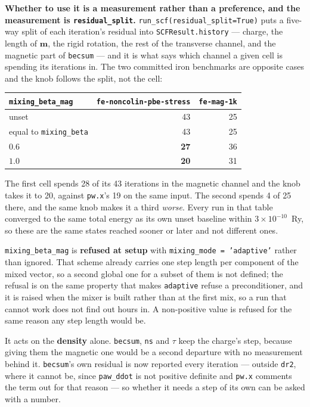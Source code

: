\documentclass[11pt,a4paper]{article}
\newcommand{\code}[1]{\texttt{\small #1}}
\begin{document}
\textbf{Whether to use it is a measurement rather than a preference, and the
measurement is \code{residual\_split}.} \code{run\_scf(residual\_split=True)}
puts a five-way split of each iteration's residual into
\code{SCFResult.history} --- charge, the length of $\mathbf m$, the rigid
rotation, the rest of the transverse channel, and the magnetic part of
\code{becsum} --- and it is what says which channel a given cell is spending its
iterations in. The two committed iron benchmarks are opposite cases and the knob
follows the split, not the cell:

\begin{center}
\begin{tabular}{lrr}
\toprule
\code{mixing\_beta\_mag} & \code{fe-noncolin-pbe-stress} & \code{fe-mag-1k} \\
\midrule
unset & 43 & 25 \\
equal to \code{mixing\_beta} & 43 & 25 \\
$0.6$ & \textbf{27} & 36 \\
$1.0$ & \textbf{20} & 31 \\
\bottomrule
\end{tabular}
\end{center}

The first cell spends 28 of its 43 iterations in the magnetic channel and the
knob takes it to 20, against \code{pw.x}'s 19 on the same input. The second
spends 4 of 25 there, and the same knob makes it a third \emph{worse}. Every run
in that table converged to the same total energy as its own unset baseline within
$3\times 10^{-10}$~Ry, so these are the same states reached sooner or later and
not different ones.

\begin{refuses}
\code{mixing\_beta\_mag} is \textbf{refused at setup} with
\code{mixing\_mode = 'adaptive'} rather than ignored. That scheme already
carries one step length per component of the mixed vector, so a second global one
for a subset of them is not defined; the refusal is on the same property that
makes \code{adaptive} refuse a preconditioner, and it is raised when the mixer is
built rather than at the first mix, so a run that cannot work does not find out
hours in. A non-positive value is refused for the same reason any step length
would be.

It acts on the \textbf{density} alone. \code{becsum}, \code{ns} and $\tau$ keep
the charge's step, because giving them the magnetic one would be a second
departure with no measurement behind it. \code{becsum}'s own residual is now
reported every iteration --- outside \code{dr2}, where it cannot be, since
\code{paw\_ddot} is not positive definite and \code{pw.x} comments the term out
for that reason --- so whether it needs a step of its own can be asked with a
number.
\end{refuses}
\end{document}
